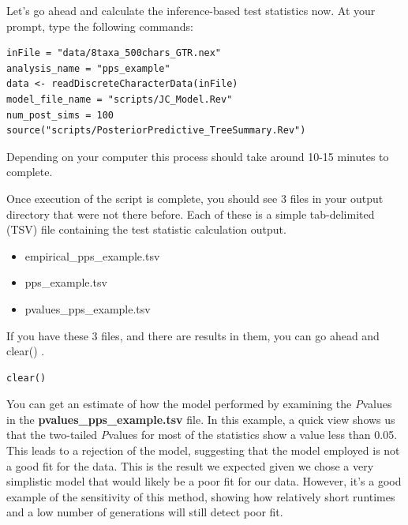 \begin{equation *}
\begin{equation *}
\begin{equation *}
Let's go ahead and calculate the inference-based test statistics now. At your \RevBayes prompt, type the 
following commands: 

{\tt \begin{Snugshade}[184,207,236]
\begin{lstlisting}  
inFile = "data/8taxa_500chars_GTR.nex"
analysis_name = "pps_example"
data <- readDiscreteCharacterData(inFile)
model_file_name = "scripts/JC_Model.Rev"
num_post_sims = 100
source("scripts/PosteriorPredictive_TreeSummary.Rev")
\end{lstlisting}
\end{Snugshade}}

Depending on your computer this process should take around 10-15 minutes to complete. 

Once execution of the script is complete, you should see 3 files in your output directory that were not 
there before. Each of these is a simple tab-delimited (TSV) file containing the test statistic calculation output.

\begin{itemize}
\item empirical\_pps\_example.tsv
\item pps\_example.tsv
\item pvalues\_pps\_example.tsv
\end{itemize}

If you have these 3 files, and there are results in them, you can go ahead and clear() \RevBayes.

{\tt \begin{Snugshade}[184,207,236]
\begin{lstlisting}  
clear()
\end{lstlisting}
\end{Snugshade}}

You can get an estimate of how the model performed by examining the \textit{P}\-values in the 
\textbf{pvalues\_pps\_example.tsv} file. In this example, a quick view shows us that the two-tailed \textit{P}\-values
for most of the statistics show a value less than 0.05. This leads to a rejection of the model, suggesting 
that the model employed is not a good fit for the data. This is the result we expected given we chose a very 
simplistic model that would likely be a poor fit for our data. However, it's a good example 
of the sensitivity of this method, showing how relatively short runtimes and a low number of generations will 
still detect poor fit. 


\end{equation *}
\end{equation *}
\end{equation *}
